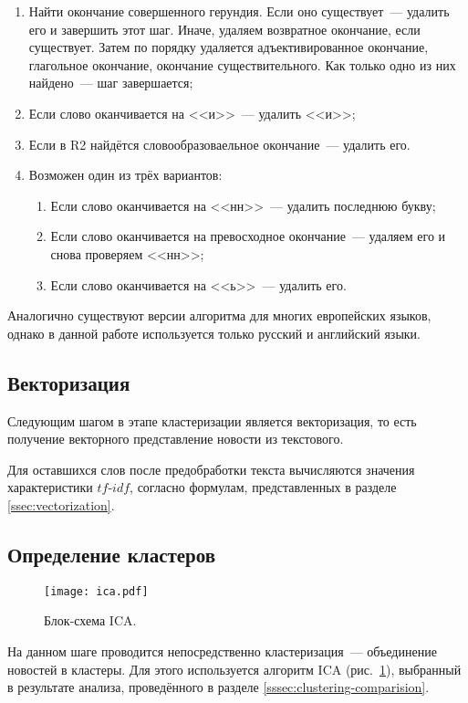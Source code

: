 \begin{enumerate}
    \item Найти окончание совершенного герундия. Если оно существует~--- удалить его и завершить этот шаг. Иначе, удаляем возвратное окончание, если существует. Затем по порядку удаляется адъективированное окончание, глагольное окончание, окончание существительного. Как только одно из них найдено~--- шаг завершается;
    \item Если слово оканчивается на <<и>>~--- удалить <<и>>;
    \item Если в R2 найдётся словообразоваельное окончание~--- удалить его.
    \item Возможен один из трёх вариантов:
        \begin{enumerate}
            \item Если слово оканчивается на <<нн>>~--- удалить последнюю букву;
            \item Если слово оканчивается на превосходное окончание~--- удаляем его и снова проверяем <<нн>>;
            \item Если слово оканчивается на <<ь>>~--- удалить его.
        \end{enumerate}
\end{enumerate}

Аналогично существуют версии алгоритма для многих европейских языков, однако в данной работе используется только русский и английский языки.

\subsection{Векторизация}
Следующим шагом в этапе кластеризации является векторизация, то есть получение векторного представление новости из текстового.

Для оставшихся слов после предобработки текста вычисляются значения характеристики $tf\text{-}idf$, согласно формулам, представленных в разделе \ref{ssec:vectorization}.

\subsection{Определение кластеров} \label{ssec:clustering}
\begin{figure}[h]
    \centering
    \texttt{[image: ica.pdf]}
    \caption{Блок-схема ICA.}
    \label{fig:ica}
\end{figure}

На данном шаге проводится непосредственно кластеризация~--- объединение новостей в кластеры. Для этого используется алгоритм ICA (рис.~\ref{fig:ica}), выбранный в результате анализа, проведённого в разделе \ref{sssec:clustering-comparision}.

